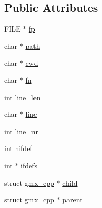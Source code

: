 \subsection*{\-Public \-Attributes}
\begin{DoxyCompactItemize}
\item 
\-F\-I\-L\-E $\ast$ \hyperlink{structgmx__cpp_a1d285a6d3dafa1c414094c6e52008891}{fp}
\item 
char $\ast$ \hyperlink{structgmx__cpp_a4fbfc2ce1eb450464d2330ad796ee06b}{path}
\item 
char $\ast$ \hyperlink{structgmx__cpp_af7a5643d6930e6af1479ecd86ffb4de1}{cwd}
\item 
char $\ast$ \hyperlink{structgmx__cpp_a5a970988b516749dd1022a00cbd89dd2}{fn}
\item 
int \hyperlink{structgmx__cpp_ac1a6b83b4f521a0ad0dc2d464552053f}{line\-\_\-len}
\item 
char $\ast$ \hyperlink{structgmx__cpp_acfd2b231193f357427893872850534fc}{line}
\item 
int \hyperlink{structgmx__cpp_ad8321aa8898c3164484d39883e462e4c}{line\-\_\-nr}
\item 
int \hyperlink{structgmx__cpp_a15fdd6a6e103f63e2c3e805a306e7666}{nifdef}
\item 
int $\ast$ \hyperlink{structgmx__cpp_ae8f421f7015c6bbe2a7aea6fb1443a9b}{ifdefs}
\item 
struct \hyperlink{structgmx__cpp}{gmx\-\_\-cpp} $\ast$ \hyperlink{structgmx__cpp_a33923f110091a48feaa7f86d91320c96}{child}
\item 
struct \hyperlink{structgmx__cpp}{gmx\-\_\-cpp} $\ast$ \hyperlink{structgmx__cpp_a9b5112498054b7701385edb88dfc939a}{parent}
\end{DoxyCompactItemize}


